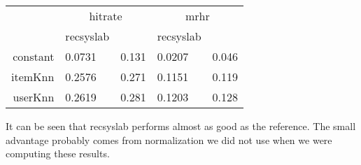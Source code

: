 \begin{tabular}{rllll} \toprule
 & \multicolumn{2}{c}{hitrate} & \multicolumn{2}{c}{mrhr} \\ \cmidrule(r){2-3} \cmidrule(r){4-5}
 & recsyslab & \cite{deshpande2004item} & recsyslab & \cite{deshpande2004item} \\ \midrule
    constant & 0.0731 & 0.131 & 0.0207 & 0.046 \\
    itemKnn & 0.2576 & 0.271 & 0.1151 & 0.119 \\
    userKnn & 0.2619 & 0.281 & 0.1203 & 0.128 \\ \bottomrule
\end{tabular}

It can be seen that recsyslab performs almost as good as the reference.
The small advantage probably comes from normalization we did not use when
we were computing these results.

